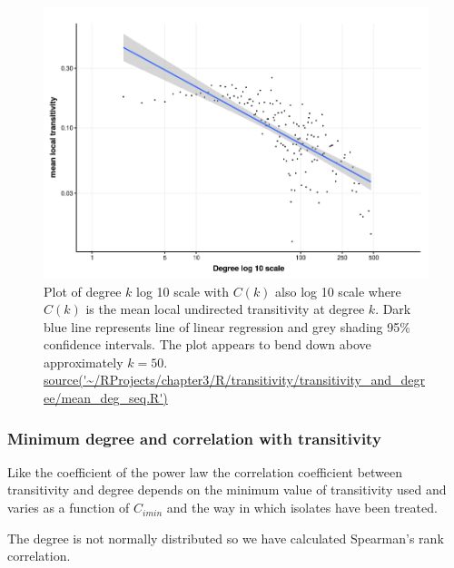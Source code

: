 \begin{figure}
    \centering
    \includegraphics[width=\textwidth]{images/chapter3/ggplot2/c(k)/Rplot_C_k_new_formatted.png}
    \caption[Log10 plot of $C(k)$ against $k$]{Plot of degree $k$ log 10 scale with $C(k)$ also log 10 scale where $C(k)$ is the mean local undirected transitivity at degree $k$. Dark blue line represents line of linear regression and grey shading 95\% confidence intervals. The plot appears to bend down above approximately $k=50$. \url{source('~/RProjects/chapter3/R/transitivity/transitivity_and_degree/mean_deg_seq.R')}}
    \label{fig:C(k)_doublelog}
\end{figure}

\subsubsection{Minimum degree and correlation with transitivity}

Like the coefficient of the power law the correlation coefficient between transitivity and degree depends on the minimum value of transitivity used and varies as a function of $C_{i min}$ and the way in which isolates have been treated.

The degree is not normally distributed so we have calculated Spearman's rank correlation. 





